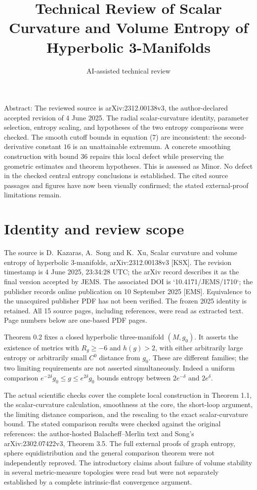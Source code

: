 \documentclass[10pt]{article}
\title{Technical Review of
Scalar Curvature and Volume Entropy
of Hyperbolic 3-Manifolds}
\author{AI-assisted technical review}
\date{}
\begin{document}
\maketitle
Abstract: The reviewed source is arXiv:2312.00138v3, the author-declared accepted revision of 4 June 2025. The radial scalar-curvature identity, parameter selection, entropy scaling, and hypotheses of the two entropy comparisons were checked. The smooth cutoff bounds in equation (7) are inconsistent: the second-derivative constant \(16\) is an unattainable extremum. A concrete smoothing construction with bound \(36\) repairs this local defect while preserving the geometric estimates and theorem hypotheses. This is assessed as Minor. No defect in the checked central entropy conclusions is established. The cited source passages and figures have now been visually confirmed; the stated external-proof limitations remain.\par
\section*{Identity and review scope}
The source is D. Kazaras, A. Song and K. Xu, Scalar curvature and volume entropy of hyperbolic 3-manifolds, arXiv:2312.00138v3 [KSX]. The revision timestamp is 4 June 2025, 23:34:28 UTC; the arXiv record describes it as the final version accepted by JEMS. The associated DOI is `10.4171/JEMS/1710`; the publisher records online publication on 10 September 2025 [EMS]. Equivalence to the unacquired publisher PDF has not been verified. The frozen 2025 identity is retained. All 15 source pages, including references, were read as extracted text. Page numbers below are one-based PDF pages.\par
Theorem 0.2 fixes a closed hyperbolic three-manifold \((M,g_0)\). It asserts the existence of metrics with \(R_g\geq-6\) and \(h(g)>2\), with either arbitrarily large entropy or arbitrarily small \(C^0\) distance from \(g_0\). These are different families; the two limiting requirements are not asserted simultaneously. Indeed a uniform comparison \(e^{-2\delta}g_0\leq g\leq e^{2\delta}g_0\) bounds entropy between \(2e^{-\delta}\) and \(2e^\delta\).\par
The actual scientific checks cover the complete local construction in Theorem 1.1, the scalar-curvature calculation, smoothness at the core, the short-loop argument, the limiting distance comparison, and the rescaling to the exact scalar-curvature bound. The stated comparison results were checked against the original references: the author-hosted Balacheff–Merlin text and Song’s arXiv:2302.07422v3, Theorem 3.5. The full external proofs of graph entropy, sphere equidistribution and the general comparison theorem were not independently reproved. The introductory claims about failure of volume stability in several metric-measure topologies were read but were not separately established by a complete intrinsic-flat convergence argument.\par
\end{document}
